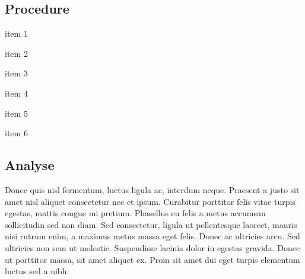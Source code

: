 \subsection{Procedure}
\begin{itemize}
\begin{multicols}{2} %
    \item{item 1}
    \item{item 2}
    \item{item 3}
    \item{item 4}
    \item{item 5}
    \item{item 6}
\end{multicols}
\end{itemize}

\subsection{Analyse}
\begin{multicols}{2}
Donec quis nisl fermentum, luctus ligula ac, interdum neque. Praesent a justo sit amet nisl aliquet consectetur nec et ipsum. Curabitur porttitor felis vitae turpis egestas, mattis congue mi pretium. Phasellus eu felis a metus accumsan sollicitudin sed non diam. Sed consectetur, ligula ut pellentesque laoreet, mauris nisi rutrum enim, a maximus metus massa eget felis. Donec ac ultricies arcu. Sed ultricies non sem ut molestie. Suspendisse lacinia dolor in egestas gravida. Donec ut porttitor massa, sit amet aliquet ex. Proin sit amet dui eget turpis elementum luctus sed a nibh.
\end{multicols}

